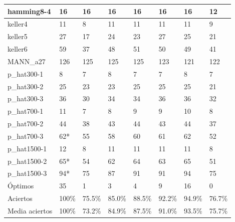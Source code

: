 \begin{table}[H]
\begin{tabular}{|l|l|l|l|l|l|l|l|}
hamming8-4         & 16 & 16 & 16 & 16 & 16 & 16 & 12 \\ \hline
keller4            & 11 & 8 & 11 & 11 & 11 & 11 & 9 \\ \hline
keller5            & 27 & 17 & 24 & 23 & 27 & 25 & 21 \\ \hline
keller6            & 59 & 37 & 48 & 51 & 50 & 49 & 41 \\ \hline
MANN\_a27          & 126 & 125 & 125 & 125 & 123 & 121 & 122 \\ \hline
p\_hat300-1        & 8 & 7 & 8 & 7 & 7 & 8 & 7 \\ \hline
p\_hat300-2        & 25 & 23 & 23 & 25 & 25 & 25 & 21 \\ \hline
p\_hat300-3        & 36 & 30 & 34 & 34 & 36 & 36 & 32 \\ \hline
p\_hat700-1        & 11 & 7 & 8 & 9 & 9 & 10 & 8 \\ \hline
p\_hat700-2        & 44 & 38 & 43 & 44 & 43 & 44 & 37 \\ \hline
p\_hat700-3        & 62* & 55 & 58 & 60 & 61 & 62 & 52 \\ \hline
p\_hat1500-1       & 12 & 8 & 11 & 11 & 11 & 11 & 8 \\ \hline
p\_hat1500-2       & 65* & 54 & 62 & 64 & 63 & 65 & 51 \\ \hline
p\_hat1500-3       & 94* & 75 & 87 & 91 & 91 & 94 & 75 \\ \hline
Óptimos            & 35  & 1  & 3  & 4  & 9  & 16 & 0  \\ \hline
Aciertos           & 100\% & 75.5\% & 85.0\% & 88.5\% & 92.2\% & 94.9\% & 76.7\% \\ \hline
Media aciertos     & 100\% & 73.2\% & 84.9\% & 87.5\% & 91.0\% & 93.5\% & 75.7\% \\ \hline
\end{tabular}
\end{table}

